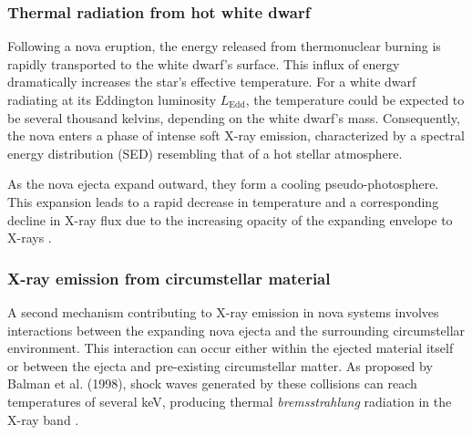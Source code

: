 			
			\subsubsection{Thermal radiation from hot white dwarf}
				Following a nova eruption, the energy released from thermonuclear burning is rapidly transported to the white dwarf's surface. This influx of energy dramatically increases the star's effective temperature. For a white dwarf radiating at its Eddington luminosity $L_\text{Edd}$, the temperature could be expected to be several thousand kelvins, depending on the white dwarf's mass. Consequently, the nova enters a phase of intense soft X-ray emission, characterized by a spectral energy distribution (SED) resembling that of a hot stellar atmosphere.
				
				As the nova ejecta expand outward, they form a cooling pseudo-photosphere. This expansion leads to a rapid decrease in temperature and a corresponding decline in X-ray flux due to the increasing opacity of the expanding envelope to X-rays \cite{krautter96}.
				
			\subsubsection{X-ray emission from circumstellar material}
				A second mechanism contributing to X-ray emission in nova systems involves interactions between the expanding nova ejecta and the surrounding circumstellar environment. This interaction can occur either within the ejected material itself or between the ejecta and pre-existing circumstellar matter. As proposed by Balman et al. (1998), shock waves generated by these collisions can reach temperatures of several keV, producing thermal \textit{bremsstrahlung} radiation in the X-ray band \cite{balman98}.


